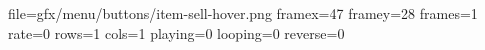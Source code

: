 file=gfx/menu/buttons/item-sell-hover.png
framex=47
framey=28
frames=1
rate=0
rows=1
cols=1
playing=0
looping=0
reverse=0